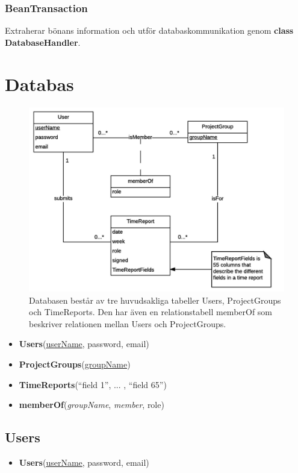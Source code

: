 \documentclass[paper=a4, fontsize=11pt,twoside]{article}
\begin{document}
\subsubsection{BeanTransaction}
Extraherar bönans information och utför databaskommunikation genom \textbf{class DatabaseHandler}.

\section{Databas}
\begin{figure}[H]
\centering
\caption{Databasen består av tre huvudsakliga tabeller Users, ProjectGroups och TimeReports. Den har även en relationstabell memberOf som beskriver relationen mellan Users och ProjectGroups.}
\includegraphics{ERmodel}
\end{figure}

\begin{itemize}
\item[] \textbf{Users}(\underline{userName}, password, email)
\item[] \textbf{ProjectGroups}(\underline{groupName})
\item[] \textbf{TimeReports}(``field 1'', ... , ``field 65'')
\item[] \textbf{memberOf}(\textit{groupName}, \textit{member}, role)
\end{itemize}

\newpage
\subsection{Users}
\begin{itemize}
\item[] \textbf{Users}(\underline{userName}, password, email)
\end{itemize}
\end{document}
